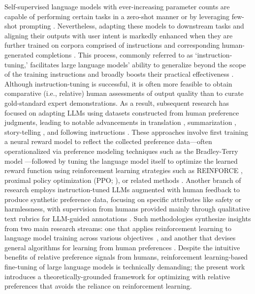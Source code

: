 Self-supervised language models with ever-increasing parameter counts are capable of performing certain tasks in a zero-shot manner \citep{radford2019language} or by leveraging few-shot prompting \citep{gpt3,megatron,chowdhery2022palm}. Nevertheless, adapting these models to downstream tasks and aligning their outputs with user intent is markedly enhanced when they are further trained on corpora comprised of instructions and corresponding human-generated completions \citep{mishra-etal-2022-cross,sanh2022multitask,chung2022scaling,thoppilan2022lamda}. This process, commonly referred to as ‘instruction-tuning,’ facilitates large language models’ ability to generalize beyond the scope of the training instructions and broadly boosts their practical effectiveness \citep{chung2022scaling}. Although instruction-tuning is successful, it is often more feasible to obtain comparative (i.e., relative) human assessments of output quality than to curate gold-standard expert demonstrations. As a result, subsequent research has focused on adapting LLMs using datasets constructed from human preference judgments, leading to notable advancements in translation \citep{kreutzer-etal-2018-reliability}, summarization \citep{stiennon2022learning,ziegler2020finetuning}, story-telling \citep{ziegler2020finetuning}, and following instructions \citep{ouyang2022training,ramamurthy2023is}. These approaches involve first training a neural reward model to reflect the collected preference data—often operationalized via preference modeling techniques such as the Bradley-Terry model \citep{bradley1952rankanalysis}—followed by tuning the language model itself to optimize the learned reward function using reinforcement learning strategies such as REINFORCE \citep{williams1992reinforce}, proximal policy optimization (PPO; \cite{schulman2017proximal}), or related methods \citep{ramamurthy2023is}. Another branch of research employs instruction-tuned LLMs augmented with human feedback to produce synthetic preference data, focusing on specific attributes like safety or harmlessness, with supervision from humans provided mainly through qualitative text rubrics for LLM-guided annotations \citep{bai2022constitutional}. Such methodologies synthesize insights from two main research streams: one that applies reinforcement learning to language model training across various objectives~\citep{Ranzato2015SequenceLT,paulus2018a,wu2018learning}, and another that devises general algorithms for learning from human preferences \citep{christiano2017deep,kupcsik2018learning}. Despite the intuitive benefits of relative preference signals from humans, reinforcement learning-based fine-tuning of large language models is technically demanding; the present work introduces a theoretically-grounded framework for optimizing with relative preferences that avoids the reliance on reinforcement learning.

